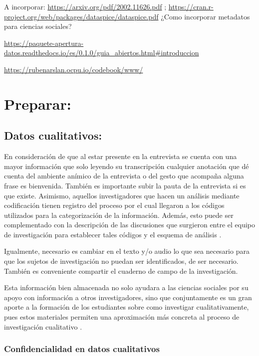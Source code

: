 \documentclass[
  14pt,
]{book}
\begin{document}
A incorporar: \url{https://arxiv.org/pdf/2002.11626.pdf} ; \url{https://cran.r-project.org/web/packages/dataspice/dataspice.pdf} ¿Como incorporar metadatos para ciencias sociales?

\url{https://paquete-apertura-datos.readthedocs.io/es/0.1.0/guia_abiertos.html\#introduccion}

\url{https://rubenarslan.ocpu.io/codebook/www/}

\hypertarget{preparar}{%
\section{\texorpdfstring{\textbf{Preparar:}}{Preparar:}}\label{preparar}}

\hypertarget{datos-cualitativos}{%
\subsection{Datos cualitativos:}\label{datos-cualitativos}}

En consideración de que al estar presente en la entrevista se cuenta con una mayor información que solo leyendo su transcripción cualquier anotación que dé cuenta del ambiente anímico de la entrevista o del gesto que acompaña alguna frase es bienvenida. También es importante subir la pauta de la entrevista si es que existe. Asimismo, aquellos investigadores que hacen un análisis mediante codificación tienen registro del proceso por el cual llegaron a los códigos utilizados para la categorización de la información. Además, esto puede ser complementado con la descripción de las discusiones que surgieron entre el equipo de investigación para establecer tales códigos y el esquema de análisis \citep{kapiszewski_Transparency_2019}.

Igualmente, necesario es cambiar en el texto y/o audio lo que sea necesario para que los sujetos de investigación no puedan ser identificados, de ser necesario. También es conveniente compartir el cuaderno de campo de la investigación.

Esta información bien almacenada no solo ayudara a las ciencias sociales por su apoyo con información a otros investigadores, sino que conjuntamente es un gran aporte a la formación de los estudiantes sobre como investigar cualitativamente, pues estos materiales permiten una aproximación más concreta al proceso de investigación cualitativo \citet{bishop_Revisiting_2017}.

\hypertarget{confidencialidad-en-datos-cualitativos}{%
\subsubsection{Confidencialidad en datos cualitativos}\label{confidencialidad-en-datos-cualitativos}}
\end{document}

